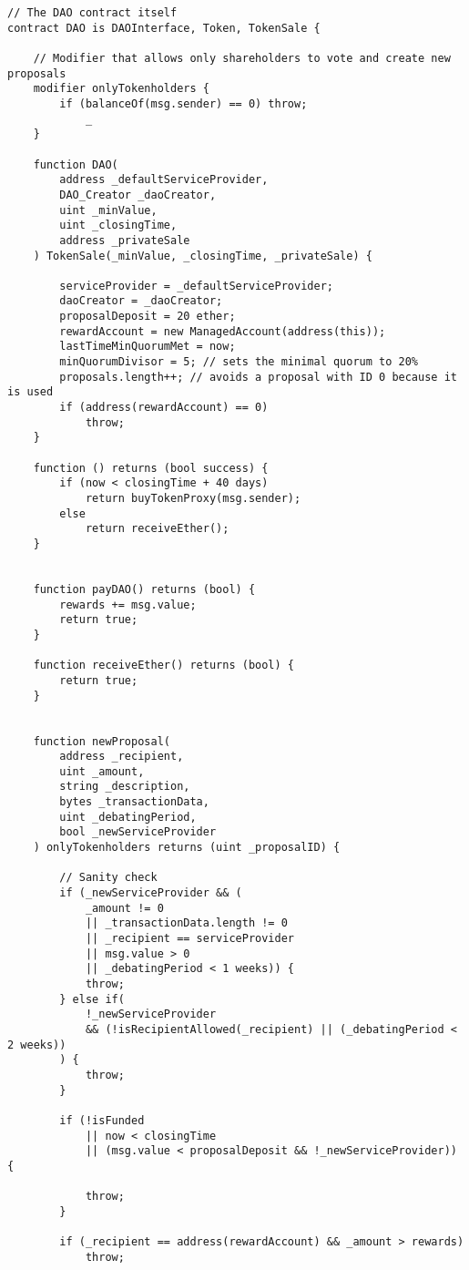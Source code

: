 \documentclass[9pt,oneside]{amsart}
\begin{document}
\begin{appendix}
\begin{verbatim}
// The DAO contract itself
contract DAO is DAOInterface, Token, TokenSale {

    // Modifier that allows only shareholders to vote and create new proposals
    modifier onlyTokenholders {
        if (balanceOf(msg.sender) == 0) throw;
            _
    }

    function DAO(
        address _defaultServiceProvider,
        DAO_Creator _daoCreator,
        uint _minValue,
        uint _closingTime,
        address _privateSale
    ) TokenSale(_minValue, _closingTime, _privateSale) {

        serviceProvider = _defaultServiceProvider;
        daoCreator = _daoCreator;
        proposalDeposit = 20 ether;
        rewardAccount = new ManagedAccount(address(this));
        lastTimeMinQuorumMet = now;
        minQuorumDivisor = 5; // sets the minimal quorum to 20%
        proposals.length++; // avoids a proposal with ID 0 because it is used
        if (address(rewardAccount) == 0)
            throw;
    }

    function () returns (bool success) {
        if (now < closingTime + 40 days)
            return buyTokenProxy(msg.sender);
        else
            return receiveEther();
    }


    function payDAO() returns (bool) {
        rewards += msg.value;
        return true;
    }

    function receiveEther() returns (bool) {
        return true;
    }


    function newProposal(
        address _recipient,
        uint _amount,
        string _description,
        bytes _transactionData,
        uint _debatingPeriod,
        bool _newServiceProvider
    ) onlyTokenholders returns (uint _proposalID) {

        // Sanity check
        if (_newServiceProvider && (
            _amount != 0
            || _transactionData.length != 0
            || _recipient == serviceProvider
            || msg.value > 0
            || _debatingPeriod < 1 weeks)) {
            throw;
        } else if(
            !_newServiceProvider
            && (!isRecipientAllowed(_recipient) || (_debatingPeriod < 2 weeks))
        ) {
            throw;
        }

        if (!isFunded
            || now < closingTime
            || (msg.value < proposalDeposit && !_newServiceProvider)) {

            throw;
        }

        if (_recipient == address(rewardAccount) && _amount > rewards)
            throw;


\end{verbatim}
\end{appendix}
\end{document}
